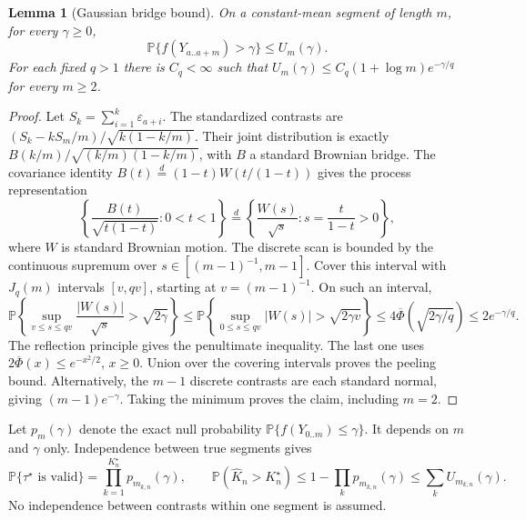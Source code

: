 \documentclass[pdflatex,sn-mathphys-num]{sn-jnl}
\newcommand{\Prob}{\mathbb P}
\newcommand{\taus}{\tau^\star}
\newcommand{\Kh}{\widehat K_n}
\theoremstyle{thmstyleone}
\newtheorem{lemma}[theorem]{Lemma}
\theoremstyle{thmstyletwo}
\begin{document}
\begin{lemma}[Gaussian bridge bound]\label{lem:null}
On a constant-mean segment of length $m$, for every $\gamma\ge0$,
\begin{equation}\label{eq:null-tail}
\Prob\{f(Y_{a..a+m})>\gamma\}\le U_m(\gamma).
\end{equation}
For each fixed $q>1$ there is $C_q<\infty$ such that
$U_m(\gamma)\le C_q(1+\log m)e^{-\gamma/q}$ for every $m\ge2$.
\end{lemma}
\begin{proof}
Let $S_k=\sum_{i=1}^k\varepsilon_{a+i}$. The standardized contrasts are
$(S_k-kS_m/m)/\sqrt{k(1-k/m)}$. Their joint distribution is exactly
$B(k/m)/\sqrt{(k/m)(1-k/m)}$, with $B$ a standard Brownian bridge.
The covariance identity
$B(t)\overset{d}=(1-t)W(t/(1-t))$ gives the process representation
\[
\left\{\frac{B(t)}{\sqrt{t(1-t)}}:0<t<1\right\}
\overset{d}=\left\{\frac{W(s)}{\sqrt{s}}:s=\frac{t}{1-t}>0\right\},
\]
where $W$ is standard Brownian motion. The discrete scan is bounded by the
continuous supremum over $s\in[(m-1)^{-1},m-1]$.
Cover this interval with $J_q(m)$ intervals $[v,qv]$, starting at
$v=(m-1)^{-1}$. On such an interval,
\[
\Prob\left\{\sup_{v\le s\le qv}\frac{|W(s)|}{\sqrt{s}}>\sqrt{2\gamma}\right\}
\le\Prob\left\{\sup_{0\le s\le qv}|W(s)|>\sqrt{2\gamma v}\right\}
\le4\overline\Phi(\sqrt{2\gamma/q})\le2e^{-\gamma/q}.
\]
The reflection principle gives the penultimate inequality.
The last one uses $2\overline\Phi(x)\le e^{-x^2/2}$, $x\ge0$.
Union over the covering intervals proves the peeling bound.
Alternatively, the $m-1$ discrete contrasts are each standard normal, giving
$(m-1)e^{-\gamma}$. Taking the minimum proves the claim, including $m=2$.
\end{proof}

Let $p_m(\gamma)$ denote the exact null probability
$\Prob\{f(Y_{0..m})\le\gamma\}$. It depends on $m$ and $\gamma$ only.
Independence between true segments gives
\begin{equation}\label{eq:true-feasibility}
\Prob\{\taus\text{ is valid}\}=\prod_{k=1}^{K_n^\star}p_{m_{k,n}}(\gamma),
\qquad
\Prob(\Kh>K_n^\star)\le1-\prod_kp_{m_{k,n}}(\gamma)
\le\sum_k U_{m_{k,n}}(\gamma).
\end{equation}
No independence between contrasts within one segment is assumed.
\end{document}
